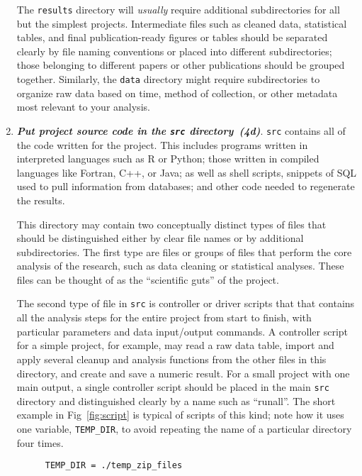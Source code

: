 \documentclass[10pt,letterpaper]{article}
\newcommand{\practice}[2]{\textbf{\emph{{#2}~({#1})}}}
\begin{document}
\begin{enumerate}
  The \texttt{results} directory will \emph{usually} require
  additional subdirectories for all but the simplest
  projects. Intermediate files such as cleaned data, statistical
  tables, and final publication-ready figures or tables should be
  separated clearly by file naming conventions or placed into
  different subdirectories; those belonging to different papers or
  other publications should be grouped together. Similarly, the
  \texttt{data} directory might require subdirectories to organize raw
  data based on time, method of collection, or other metadata most
  relevant to your analysis.

\item

  \practice{4d}{Put project source code in the \texttt{src}
  directory}.  \texttt{src} contains all of the code written for the
  project. This includes programs written in interpreted languages
  such as R or Python; those written in compiled languages like Fortran,
  C++, or Java; as well as shell scripts, snippets of SQL used to pull
  information from databases; and other code needed to regenerate the
  results.

  This directory may contain two conceptually distinct types of files
  that should be distinguished either by clear file names or by
  additional subdirectories. The first type are files or groups of
  files that perform the core analysis of the research, such as data
  cleaning or statistical analyses.  These files can be thought of as
  the ``scientific guts'' of the project.

  The second type of file in \texttt{src} is controller or driver
  scripts that that contains all the analysis steps for the entire
  project from start to finish, with particular parameters and data
  input/output commands. A controller script for a simple project, for
  example, may read a raw data table, import and apply several cleanup
  and analysis functions from the other files in this directory, and
  create and save a numeric result. For a small project with one main
  output, a single controller script should be placed in the main
  \texttt{src} directory and distinguished clearly by a name such as
  ``runall''.  The short example in Fig~\ref{fig:script} is typical
  of scripts of this kind; note how it uses one variable,
  \texttt{TEMP\_DIR}, to avoid repeating the name of a particular
  directory four times.

\begin{figure}
{\small
\begin{verbatim}
TEMP_DIR = ./temp_zip_files


\end{verbatim}}
\end{figure}
\end{enumerate}
\end{document}

